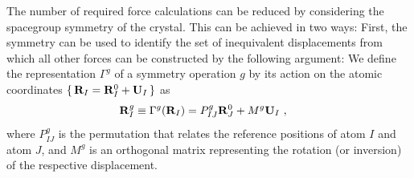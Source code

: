 The number of required force calculations can be reduced by considering the spacegroup symmetry of the crystal. This can be achieved in two ways: First, the symmetry can be used to identify the set of inequivalent displacements from which all other forces can be constructed by the following argument: We define the representation $\Gamma^g$ of a symmetry operation $g$ by its action on the atomic coordinates $\set{{\bf R}_I = {\bf R}_I^0 + {\bf U}_I}$ as
\begin{align}
	\b R_I^{g} &\equiv {\Gamma}^g (\b R_I) = { P}^g_{IJ} \b R^0_J + { M}^g \b U_I~,
	\label{eq:sym.RI'}
\end{align}	
where $P^g_{IJ}$ is the permutation that relates the reference positions of atom $I$ and atom $J$, and $M^g$ is an orthogonal matrix representing the rotation (or inversion) of the respective displacement. 
\begin{marginfigure}
  \centering

\end{marginfigure}

